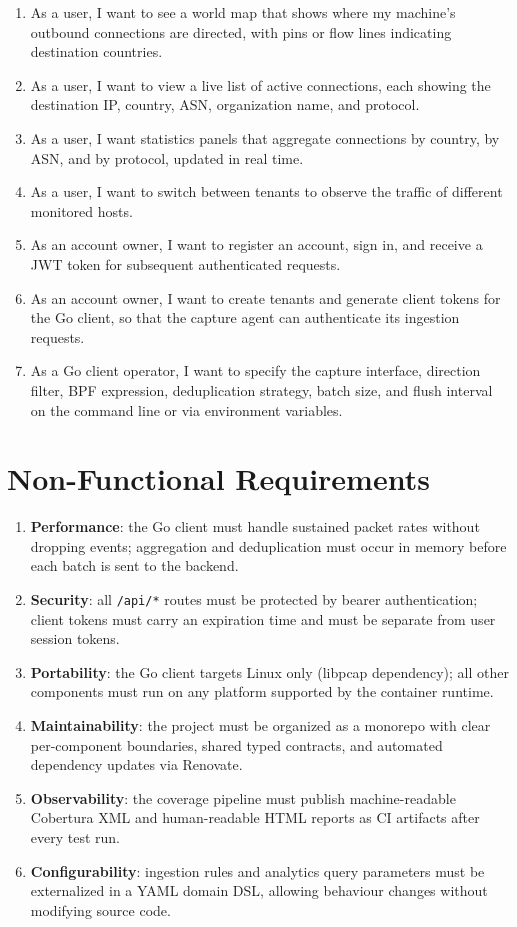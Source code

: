 \documentclass[12pt]{report}
\begin{document}
\begin{enumerate}
  \item As a user, I want to see a world map that shows where my machine's
    outbound connections are directed, with pins or flow lines indicating
    destination countries.
  \item As a user, I want to view a live list of active connections, each
    showing the destination IP, country, ASN, organization name, and protocol.
  \item As a user, I want statistics panels that aggregate connections by
    country, by ASN, and by protocol, updated in real time.
  \item As a user, I want to switch between tenants to observe the traffic of
    different monitored hosts.
  \item As an account owner, I want to register an account, sign in, and receive a JWT
    token for subsequent authenticated requests.
  \item As an account owner, I want to create tenants and generate client tokens for
    the Go client, so that the capture agent can authenticate its ingestion
    requests.
  \item As a Go client operator, I want to specify the capture interface,
    direction filter, BPF expression, deduplication strategy, batch size,
    and flush interval on the command line or via environment variables.
\end{enumerate}

\newpage
\section{Non-Functional Requirements}

\begin{enumerate}
  \item \textbf{Performance}: the Go client must handle sustained packet rates
    without dropping events; aggregation and deduplication must occur in memory
    before each batch is sent to the backend.
  \item \textbf{Security}: all \texttt{/api/*} routes must be protected by
    bearer authentication; client tokens must carry an expiration time and must
    be separate from user session tokens.
  \item \textbf{Portability}: the Go client targets Linux only (libpcap
    dependency); all other components must run on any platform supported by the
    container runtime.
  \item \textbf{Maintainability}: the project must be organized as a monorepo
    with clear per-component boundaries, shared typed contracts, and automated
    dependency updates via Renovate.
  \item \textbf{Observability}: the coverage pipeline must publish machine-readable
    Cobertura XML and human-readable HTML reports as CI artifacts after every
    test run.
  \item \textbf{Configurability}: ingestion rules and analytics query parameters
    must be externalized in a YAML domain DSL, allowing behaviour changes without
    modifying source code.
\end{enumerate}
\end{document}
